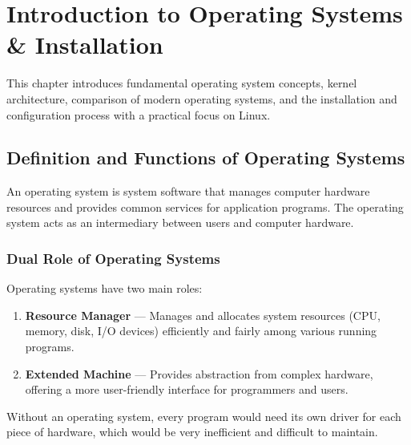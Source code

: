 
\chapter{Introduction to Operating Systems \& Installation}
\label{ch:introduction}

This chapter introduces fundamental operating system concepts, kernel architecture, comparison of modern operating systems, and the installation and configuration process with a practical focus on Linux.


\section{Definition and Functions of Operating Systems}
\label{sec:os-basics}

An operating system is system software that manages computer hardware resources and provides common services for application programs. The operating system acts as an intermediary between users and computer hardware.

\subsection{Dual Role of Operating Systems}

Operating systems have two main roles:

\begin{enumerate}
    \item \textbf{Resource Manager} --- Manages and allocates system resources (CPU, memory, disk, I/O devices) efficiently and fairly among various running programs.

    \item \textbf{Extended Machine} --- Provides abstraction from complex hardware, offering a more user-friendly interface for programmers and users.
\end{enumerate}

\begin{notebox}
Without an operating system, every program would need its own driver for each piece of hardware, which would be very inefficient and difficult to maintain.
\end{notebox}

